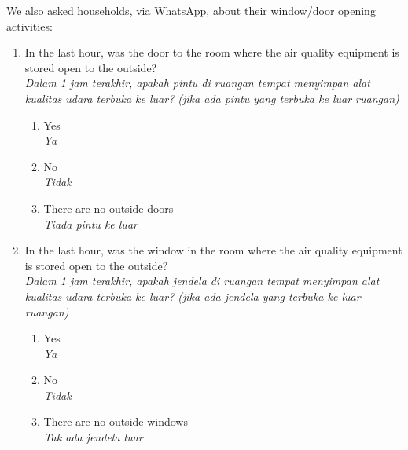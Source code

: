\documentclass[reqno,12pt,notitlepage]{article}
\begin{document}
We also asked households, via WhatsApp, about their window/door opening activities:
\begin{enumerate}
    \item In the last hour, was the door to the room where the air quality equipment is stored open to the outside? \\ \textit{Dalam 1 jam terakhir, apakah pintu di ruangan tempat menyimpan alat kualitas udara terbuka ke luar? (jika ada pintu yang terbuka ke luar ruangan)}
    \begin{enumerate}
        \item Yes \\ \textit{Ya}
        \item No \\ \textit{Tidak}
        \item There are no outside doors \\ \textit{Tiada pintu ke luar}
    \end{enumerate}
        \item In the last hour, was the window in the room where the air quality equipment is stored open to the outside? \\ \textit{Dalam 1 jam terakhir, apakah jendela di ruangan tempat menyimpan alat kualitas udara terbuka ke luar? (jika ada jendela yang terbuka ke luar ruangan)}
    \begin{enumerate}
        \item Yes \\ \textit{Ya}
        \item No \\ \textit{Tidak}
        \item There are no outside windows \\ \textit{Tak ada jendela luar}
    \end{enumerate}
\end{enumerate}
\end{document}
